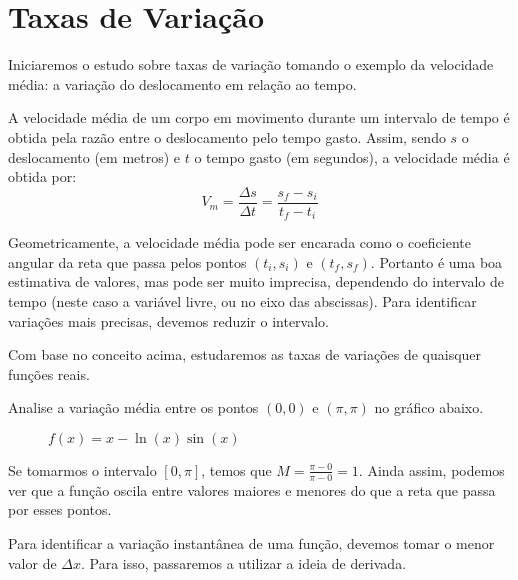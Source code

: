 \section{Taxas de Variação}
Iniciaremos o estudo sobre taxas de variação tomando o exemplo da velocidade média: a variação do deslocamento em relação ao tempo. \par 
A velocidade média de um corpo em movimento durante um intervalo de tempo é obtida pela razão entre o deslocamento pelo tempo gasto. Assim, sendo $s$ o deslocamento (em metros) e $t$ o tempo gasto (em segundos), a velocidade média é obtida por:
\[V_m=\dfrac{\Delta s}{\Delta t}=\dfrac{s_f-s_i}{t_f-t_i}\] \par 
Geometricamente, a velocidade média pode ser encarada como o coeficiente angular da reta que passa pelos pontos $(t_i,s_i)$ e $(t_f,s_f)$. Portanto é uma boa estimativa de valores, mas pode ser muito imprecisa, dependendo do intervalo de tempo (neste caso a variável livre, ou no eixo das abscissas). Para identificar variações mais precisas, devemos reduzir o intervalo. \par 
Com base no conceito acima, estudaremos as taxas de variações de quaisquer funções reais.
\begin{exemplo}
Analise a variação média entre os pontos $(0,0)$ e $(\pi, \pi)$ no gráfico abaixo.
\begin{figure}[H] 
\centering
    \caption[Variação média]{$f(x)=x-\ln(x)\sin(x)$} 
\end{figure}
Se tomarmos o intervalo $[0, \pi]$, temos que $M = \frac{\pi - 0}{\pi -0}=1$. Ainda assim, podemos ver que a função oscila entre valores maiores e menores do que a reta que passa por esses pontos.
\end{exemplo}
Para identificar a variação instantânea de uma função, devemos tomar o menor valor de $\Delta x$. Para isso, passaremos a utilizar a ideia de derivada.